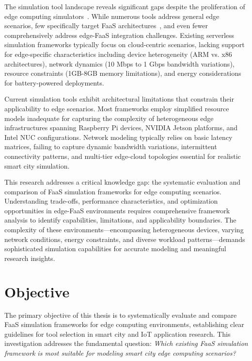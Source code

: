 The simulation tool landscape reveals significant gaps despite the proliferation of edge computing simulators~\cite{svorobej2019simulating}. While numerous tools address general edge scenarios, few specifically target FaaS architectures~\cite{mahmoudi2021simfaas}, and even fewer comprehensively address edge-FaaS integration challenges. Existing serverless simulation frameworks typically focus on cloud-centric scenarios, lacking support for edge-specific characteristics including device heterogeneity (ARM vs. x86 architectures), network dynamics (10 Mbps to 1 Gbps bandwidth variations), resource constraints (1GB-8GB memory limitations), and energy considerations for battery-powered deployments.

Current simulation tools exhibit architectural limitations that constrain their applicability to edge scenarios. Most frameworks employ simplified resource models inadequate for capturing the complexity of heterogeneous edge infrastructures spanning Raspberry Pi devices, NVIDIA Jetson platforms, and Intel NUC configurations. Network modeling typically relies on basic latency matrices, failing to capture dynamic bandwidth variations, intermittent connectivity patterns, and multi-tier edge-cloud topologies essential for realistic smart city simulation.

This research addresses a critical knowledge gap: the systematic evaluation and comparison of FaaS simulation frameworks for edge computing scenarios. Understanding trade-offs, performance characteristics, and optimization opportunities in edge-FaaS environments requires comprehensive framework analysis to identify capabilities, limitations, and applicability boundaries. The complexity of these environments—encompassing heterogeneous devices, varying network conditions, energy constraints, and diverse workload patterns—demands sophisticated simulation capabilities for accurate modeling and meaningful research insights.

\section{Objective}

The primary objective of this thesis is to systematically evaluate and compare FaaS simulation frameworks for edge computing environments, establishing clear guidelines for tool selection in smart city and IoT application research. This investigation addresses the fundamental question: \textit{Which existing FaaS simulation framework is most suitable for modeling smart city edge computing scenarios?}

